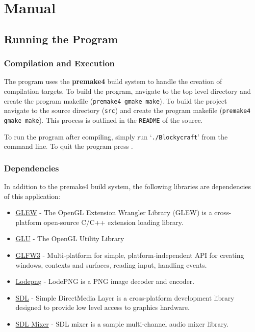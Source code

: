 \documentclass{book}
\begin{document}
\chapter{Manual}
\section{Running the Program}
\subsection{Compilation and Execution}
The program uses the \textbf{premake4} build system to handle the creation of compilation targets.  To build the program, navigate to the top level directory and create the program makefile (\texttt{premake4 gmake  make}).  To build the project navigate to the source directory (\texttt{src}) and create the program makefile (\texttt{premake4 gmake make}).
This process is outlined in the \texttt{README} of the source.

To run the program after compiling, simply run `\texttt{./Blockycraft}' from the command line.  To quit the program press .


\subsection{Dependencies}
In addition to the premake4 build system, the following libraries are dependencies of this application: 
\begin{itemize}
	\item \href{https://github.com/nigels-com/glew}{GLEW} - The OpenGL Extension Wrangler Library (GLEW) is a cross-platform open-source C/C++ extension loading library.
	\item \href{https://www.opengl.org/resources/libraries/}{GLU} - The OpenGL Utility Library
	\item \href{http://www.glfw.org/docs/latest/}{GLFW3} - Multi-platform for simple, platform-independent API for creating windows, contexts and surfaces, reading input, handling events.
	\item \href{http://lodev.org/lodepng/}{Lodepng} - LodePNG is a PNG image decoder and encoder.
	\item \href{https://www.libsdl.org/}{SDL} - Simple DirectMedia Layer is a cross-platform development library designed to provide low level access to graphics hardware.
	\item \href{https://www.libsdl.org/projects/SDL_mixer/}{SDL Mixer} - SDL mixer is a sample multi-channel audio mixer library. 
\end{itemize}
\end{document}
